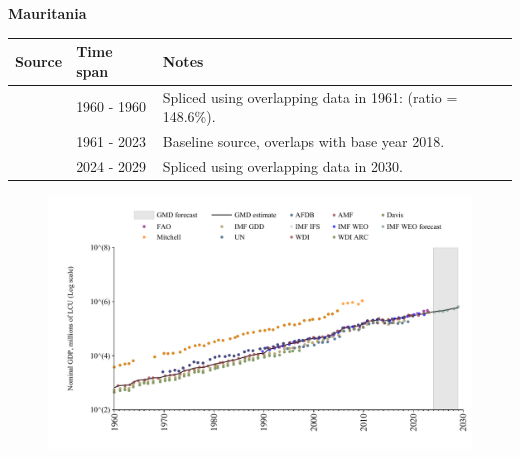 \documentclass[12pt,a4paper,landscape]{article}
\begin{document}
\begin{adjustbox}{max totalsize={\paperwidth}{\paperheight},center}
\begin{minipage}[t][\textheight][t]{\textwidth}
\vspace*{0.5cm}
{}
\begin{center}
{\Large\bfseries Mauritania}
\end{center}
\vspace{0.5cm}
\begin{table}[H]
\centering
\small
\begin{tabular}{|l|l|l|}
\hline
\textbf{Source} & \textbf{Time span} & \textbf{Notes} \\
\hline
\rowcolor{white}\cite{WDI_ARC}& 1960 - 1960 &Spliced using overlapping data in 1961: (ratio = 148.6\%).\\
\rowcolor{lightgray}\cite{WDI}& 1961 - 2023 &Baseline source, overlaps with base year 2018.\\
\rowcolor{white}\cite{IMF_WEO_forecast}& 2024 - 2029 &Spliced using overlapping data in 2030.\\
\hline
\end{tabular}
\end{table}
\begin{figure}[H]
\centering
\includegraphics[width=\textwidth,height=0.6\textheight,keepaspectratio]{graphs/MRT_nGDP.pdf}
\end{figure}
\end{minipage}
\end{adjustbox}
\end{document}
